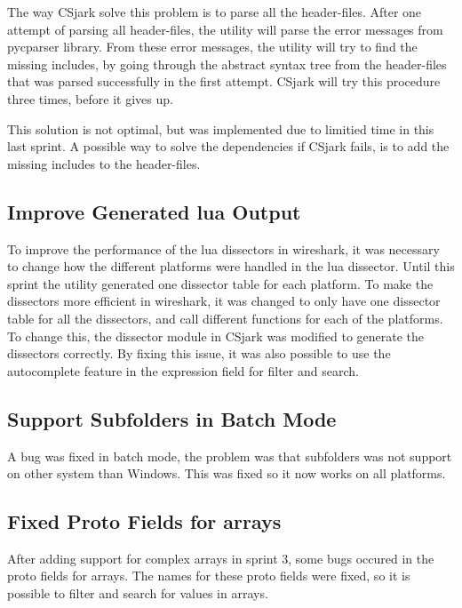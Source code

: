 The way CSjark solve this problem is to parse all the header-files. After one 
attempt of parsing all header-files, the utility will parse the error messages 
from pycparser library. From these error messages, the utility will try to 
find the missing includes, by going through the abstract syntax tree from the 
header-files that was parsed successfully in the first attempt. CSjark will 
try this procedure three times, before it gives up.

This solution is not optimal, but was implemented due to limitied time in this 
last sprint. A possible way to solve the dependencies if CSjark fails, is to 
add the missing includes to the header-files.

\subsection{Improve Generated \Gls{lua} Output}
To improve the performance of the \Gls{lua} \glspl{dissector} in \Gls{wireshark}, it was 
necessary to change how the different platforms were handled in the \Gls{lua} 
\gls{dissector}. Until this sprint the \gls{utility} generated one \gls{dissector} table for 
each platform. To make the \glspl{dissector} more efficient in \Gls{wireshark}, it was 
changed to only have one \gls{dissector} table for all the \glspl{dissector}, and call 
different functions for each of the platforms. To change this, the \gls{dissector} 
module in CSjark was modified to generate the \glspl{dissector} correctly. By fixing 
this issue, it was also possible to use the autocomplete feature in the 
expression field for filter and search.

\subsection{Support Subfolders in Batch Mode}
A bug was fixed in batch mode, the problem was that subfolders was not support 
on other system than Windows. This was fixed so it now works on all platforms.

\subsection{Fixed Proto Fields for \Glspl{array}}
After adding support for complex \glspl{array} in sprint 3, some bugs occured in the 
proto fields for \glspl{array}. The names for these proto fields were fixed, so it is 
possible to filter and search for values in \glspl{array}. 

